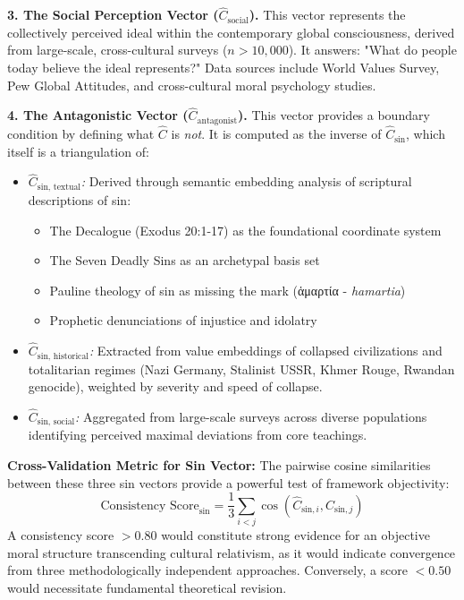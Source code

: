 \documentclass[11pt,a4paper]{article}
\theoremstyle{definition}
\theoremstyle{remark}
\begin{document}
\textbf{3. The Social Perception Vector (\(\hat{C}_{\text{social}}\)).} This vector represents the collectively perceived ideal within the contemporary global consciousness, derived from large-scale, cross-cultural surveys (\(n > 10,000\)). It answers: "What do people today believe the ideal represents?" Data sources include World Values Survey, Pew Global Attitudes, and cross-cultural moral psychology studies.

\textbf{4. The Antagonistic Vector (\(\hat{C}_{\text{antagonist}}\)).} This vector provides a boundary condition by defining what \(\hat{C}\) is \textit{not}. It is computed as the inverse of \(\hat{C}_{\text{sin}}\), which itself is a triangulation of:
\begin{itemize}
    \item \textit{\(\hat{C}_{\text{sin, textual}}\):} Derived through semantic embedding analysis of scriptural descriptions of sin:
        \begin{itemize}
            \item The Decalogue (Exodus 20:1-17) as the foundational coordinate system
            \item The Seven Deadly Sins as an archetypal basis set
            \item Pauline theology of sin as missing the mark (ἁμαρτία - \textit{hamartia})
            \item Prophetic denunciations of injustice and idolatry
        \end{itemize}
    \item \textit{\(\hat{C}_{\text{sin, historical}}\):} Extracted from value embeddings of collapsed civilizations and totalitarian regimes (Nazi Germany, Stalinist USSR, Khmer Rouge, Rwandan genocide), weighted by severity and speed of collapse.
    \item \textit{\(\hat{C}_{\text{sin, social}}\):} Aggregated from large-scale surveys across diverse populations identifying perceived maximal deviations from core teachings.
\end{itemize}

\textbf{Cross-Validation Metric for Sin Vector:} The pairwise cosine similarities between these three sin vectors provide a powerful test of framework objectivity:
\begin{equation}
\text{Consistency Score}_{\text{sin}} = \frac{1}{3}\sum_{i<j} \cos(\hat{C}_{\text{sin}, i}, \hat{C}_{\text{sin}, j})
\end{equation}
A consistency score \(> 0.80\) would constitute strong evidence for an objective moral structure transcending cultural relativism, as it would indicate convergence from three methodologically independent approaches. Conversely, a score \(< 0.50\) would necessitate fundamental theoretical revision.
\end{document}
